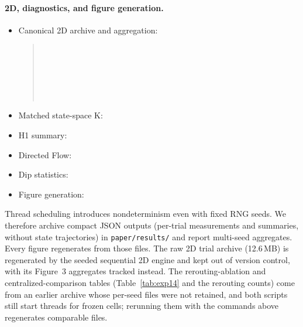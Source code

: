 \documentclass[11pt]{article}
\begin{document}
\paragraph{2D, diagnostics, and figure generation.}
\begin{itemize}
  \item Canonical 2D archive and aggregation:
  \begin{quote}\small
  \texttt{}\\
  \texttt{}\\
  \texttt{}\\
  \texttt{}\\
  \texttt{}\\
  \texttt{}
  \end{quote}
  \item Matched state-space K:
  \begin{quote}\small
  \texttt{}
  \end{quote}
  \item H1 summary:
  \begin{quote}\small
  \texttt{}
  \end{quote}
  \item Directed Flow:
  \begin{quote}\small
  \texttt{}
  \end{quote}
  \item Dip statistics:
  \begin{quote}\small
  \texttt{}
  \end{quote}
  \item Figure generation:
  \begin{quote}\small
  \texttt{}
  \end{quote}
\end{itemize}

Thread scheduling introduces nondeterminism even with fixed RNG seeds. We therefore archive compact
JSON outputs (per-trial measurements and summaries, without state trajectories) in
\texttt{paper/results/} and report multi-seed aggregates. Every figure regenerates from those files.
The raw 2D trial archive (12.6\,MB) is regenerated by the seeded sequential 2D engine and kept out
of version control, with its Figure~3 aggregates tracked instead. The rerouting-ablation and
centralized-comparison tables (Table~\ref{tab:exp14} and the rerouting counts) come from an earlier
archive whose per-seed files were not retained, and both scripts still start threads for frozen
cells; rerunning them with the commands above regenerates comparable files.



\end{document}

